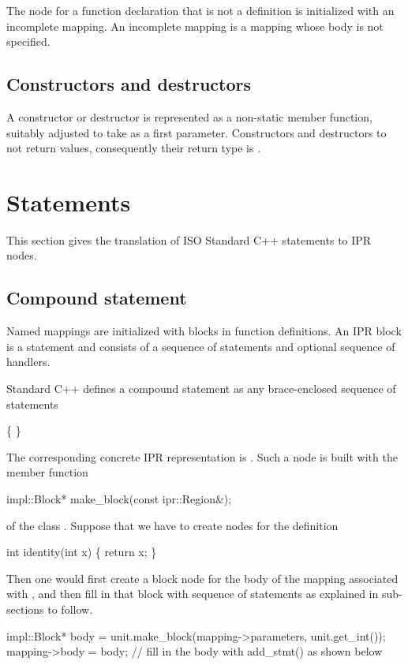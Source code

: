 \documentclass[11pt]{article}
\begin{document}
The node for a function declaration that is not a definition is initialized
with an incomplete mapping.   An incomplete mapping is a mapping whose body is
not specified.


\subsection{Constructors and destructors}

A constructor or destructor is represented as a non-static member function,
suitably adjusted to take  as a first parameter.  Constructors and
destructors to not return values, consequently their return type is
.

\section{Statements}
\label{sec:statements}

This section gives the translation of ISO Standard C++ statements to IPR
nodes. 

\subsection{Compound statement}
\label{sec:stmt.compound}

Named mappings are initialized with blocks in function definitions.
An IPR block is a statement and consists of a sequence of statements and
optional sequence of handlers.

Standard C++ defines a compound statement as any brace-enclosed sequence of
statements
\begin{Grammar}
     \{  \}

       
\end{Grammar}

The corresponding concrete IPR representation is .
Such a node is built with the member function
\begin{Program}
  impl::Block* make_block(const ipr::Region&);
\end{Program}
of the class .  Suppose that we have to create nodes for
the definition
\begin{Program}
  int identity(int x) \{ return x; \}
\end{Program}
Then one would first create a block node for the body of the mapping
associated with , and then fill in that block with sequence of
statements as explained in sub-sections to follow.
\begin{Program}
impl::Block* body = unit.make_block(mapping->parameters, unit.get_int());
mapping->body = body;
// fill in the body with add_stmt() as shown below
\end{Program}
\end{document}
